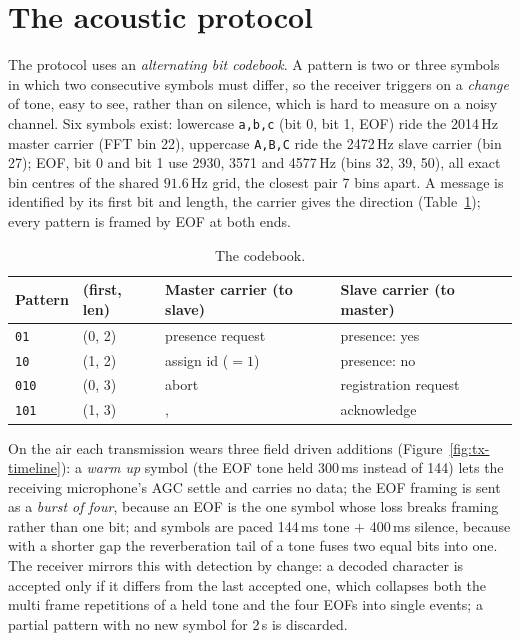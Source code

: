 \documentclass[a4paper,10pt]{article}
\begin{document}
\section{The acoustic protocol}
\label{sec:protocol}

The protocol uses an \emph{alternating bit codebook}. A pattern is two or three
symbols in which two consecutive symbols must differ, so the receiver triggers on a
\emph{change} of tone, easy to see, rather than on silence, which is hard to
measure on a noisy channel. Six symbols exist: lowercase \texttt{a,b,c} (bit 0,
bit 1, EOF) ride the 2014\,Hz master carrier (FFT bin 22), uppercase
\texttt{A,B,C} ride the 2472\,Hz slave carrier (bin 27); EOF, bit 0 and bit 1 use
2930, 3571 and 4577\,Hz (bins 32, 39, 50), all exact bin centres of the shared
$91.6$\,Hz grid, the closest pair 7 bins apart. A message is identified by its first
bit and length, the carrier gives the direction (Table~\ref{tab:codebook}); every
pattern is framed by EOF at both ends.

\begin{table}[H]
\centering
\caption{The codebook.}
\label{tab:codebook}
\small
\begin{tabular}{llll}
\toprule
\textbf{Pattern} & \textbf{(first, len)} & \textbf{Master carrier (to slave)} & \textbf{Slave carrier (to master)} \\
\midrule
\texttt{01} & (0, 2) & presence request & presence: yes \\
\texttt{10} & (1, 2) & assign id ($=1$) & presence: no \\
\texttt{010} & (0, 3) & abort & registration request \\
\texttt{101} & (1, 3) &, & acknowledge \\
\bottomrule
\end{tabular}
\end{table}

On the air each transmission wears three field driven additions
(Figure~\ref{fig:tx-timeline}): a \emph{warm up} symbol (the EOF tone held 300\,ms
instead of 144) lets the receiving microphone's AGC settle and carries no data; the
EOF framing is sent as a \emph{burst of four}, because an EOF is the one symbol
whose loss breaks framing rather than one bit; and symbols are paced 144\,ms tone
$+$ 400\,ms silence, because with a shorter gap the reverberation tail of a tone
fuses two equal bits into one. The receiver mirrors this with detection by change: a
decoded character is accepted only if it differs from the last accepted one, which
collapses both the multi frame repetitions of a held tone and the four EOFs into
single events; a partial pattern with no new symbol for 2\,s is discarded.
\end{document}
